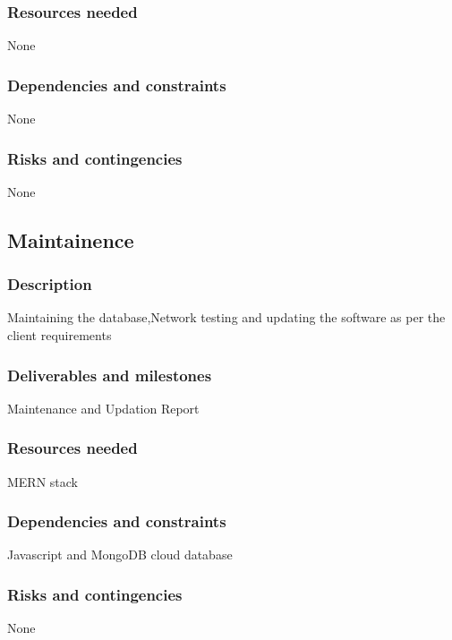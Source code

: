 \documentclass[12pt, letterpaper, twoside]{report}
\begin{document}
\subsubsection{Resources needed}
None
\subsubsection{Dependencies and constraints}
None
\subsubsection{Risks and contingencies}
None
\subsection{Maintainence}
\subsubsection{Description}
Maintaining the database,Network testing and updating the
software as per the client requirements
\subsubsection{Deliverables and milestones}
Maintenance and Updation Report
\subsubsection{Resources needed}
MERN stack
\subsubsection{Dependencies and constraints}
Javascript and MongoDB cloud database
\subsubsection{Risks and contingencies}
None
\newpage
\end{document}
